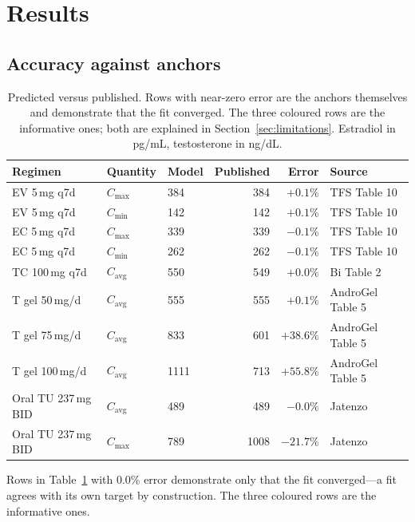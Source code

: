 \documentclass[11pt,a4paper]{article}
\newcommand{\bad}[1]{\textcolor{warn}{#1}}
\newcommand{\good}[1]{\textcolor{ok}{#1}}
\begin{document}
\section{Results}
\label{sec:results}

\subsection{Accuracy against anchors}
\label{sec:accuracy}

\begin{table}[h]
\centering
\small
\begin{tabular}{@{}lllrrl@{}}
\toprule
\textbf{Regimen} & \textbf{Quantity} & \textbf{Model} & \textbf{Published}
                 & \textbf{Error} & \textbf{Source} \\
\midrule
EV 5\,mg q7d & $C_{\max}$ & 384 & 384 & \good{$+0.1\%$} & TFS Table 10 \\
EV 5\,mg q7d & $C_{\min}$ & 142 & 142 & \good{$+0.1\%$} & TFS Table 10 \\
EC 5\,mg q7d & $C_{\max}$ & 339 & 339 & \good{$-0.1\%$} & TFS Table 10 \\
EC 5\,mg q7d & $C_{\min}$ & 262 & 262 & \good{$-0.1\%$} & TFS Table 10 \\
TC 100\,mg q7d & $C_{\mathrm{avg}}$ & 550 & 549 & \good{$+0.0\%$} & Bi Table 2 \\
T gel 50\,mg/d & $C_{\mathrm{avg}}$ & 555 & 555 & \good{$+0.1\%$} & AndroGel Table 5 \\
T gel 75\,mg/d & $C_{\mathrm{avg}}$ & 833 & 601 & \bad{$+38.6\%$} & AndroGel Table 5 \\
T gel 100\,mg/d & $C_{\mathrm{avg}}$ & 1111 & 713 & \bad{$+55.8\%$} & AndroGel Table 5 \\
Oral TU 237\,mg BID & $C_{\mathrm{avg}}$ & 489 & 489 & \good{$-0.0\%$} & Jatenzo \\
Oral TU 237\,mg BID & $C_{\max}$ & 789 & 1008 & \bad{$-21.7\%$} & Jatenzo \\
\bottomrule
\end{tabular}
\caption{Predicted versus published. Rows with near-zero error are the
anchors themselves and demonstrate that the fit converged. The three
coloured rows are the informative ones; both are explained in
Section~\ref{sec:limitations}. Estradiol in pg/mL, testosterone in
ng/dL.}
\label{tab:accuracy}
\end{table}

Rows in Table~\ref{tab:accuracy} with 0.0\% error demonstrate only that
the fit converged---a fit agrees with its own target by construction.
The three coloured rows are the informative ones.
\end{document}
